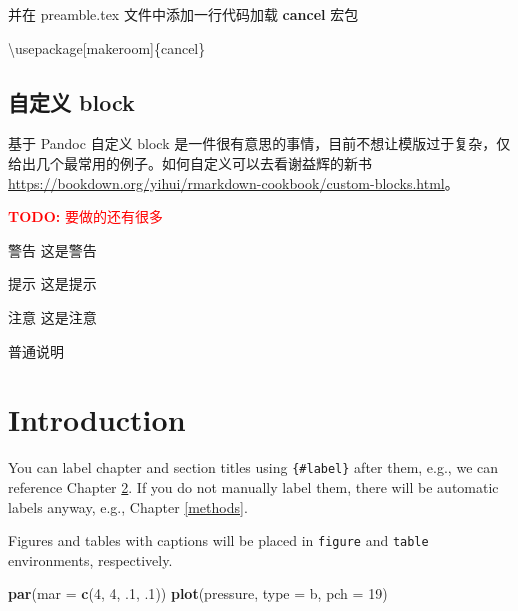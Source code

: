 \documentclass[
  lang=cn,
  11pt,
  scheme=chinese,
  chinesefont=nofont,
  citestyle=gb7714-2015,
  bibstyle=gb7714-2015]{elegantbook}
\newenvironment{Shaded}{\begin{snugshade}}{\end{snugshade}}
\newcommand{\BuiltInTok}[1]{#1}
\newcommand{\DataTypeTok}[1]{\textcolor[rgb]{0.13,0.29,0.53}{#1}}
\newcommand{\DecValTok}[1]{\textcolor[rgb]{0.00,0.00,0.81}{#1}}
\newcommand{\ExtensionTok}[1]{#1}
\newcommand{\FloatTok}[1]{\textcolor[rgb]{0.00,0.00,0.81}{#1}}
\newcommand{\KeywordTok}[1]{\textcolor[rgb]{0.13,0.29,0.53}{\textbf{#1}}}
\newcommand{\NormalTok}[1]{#1}
\newcommand{\StringTok}[1]{\textcolor[rgb]{0.31,0.60,0.02}{#1}}
\begin{document}
并在 preamble.tex 文件中添加一行代码加载 \textbf{cancel} 宏包

\begin{Shaded}
\begin{Highlighting}[]
\BuiltInTok{\textbackslash{}usepackage}\NormalTok{[makeroom]\{}\ExtensionTok{cancel}\NormalTok{\}}
\end{Highlighting}
\end{Shaded}

\hypertarget{custom-block}{%
\section{自定义 block}\label{custom-block}}

基于 Pandoc 自定义 block 是一件很有意思的事情，目前不想让模版过于复杂，仅给出几个最常用的例子。如何自定义可以去看谢益辉的新书 \url{https://bookdown.org/yihui/rmarkdown-cookbook/custom-blocks.html}。

\textcolor{red}{\textbf{TODO: }{要做的还有很多}}

\begin{rmdwarn}{警告}
这是警告

\end{rmdwarn}

\begin{rmdtip}{提示}
这是提示

\end{rmdtip}

\begin{rmdnote}{注意}
这是注意

\end{rmdnote}

普通说明

\hypertarget{intro}{%
\chapter{Introduction}\label{intro}}

You can label chapter and section titles using \texttt{\{\#label\}} after them, e.g., we can reference Chapter \ref{intro}. If you do not manually label them, there will be automatic labels anyway, e.g., Chapter \ref{methods}.

Figures and tables with captions will be placed in \texttt{figure} and \texttt{table} environments, respectively.

\begin{Shaded}
\begin{Highlighting}[]
\KeywordTok{par}\NormalTok{(}\DataTypeTok{mar =} \KeywordTok{c}\NormalTok{(}\DecValTok{4}\NormalTok{, }\DecValTok{4}\NormalTok{, }\FloatTok{.1}\NormalTok{, }\FloatTok{.1}\NormalTok{))}
\KeywordTok{plot}\NormalTok{(pressure, }\DataTypeTok{type =} \StringTok{\textquotesingle{}b\textquotesingle{}}\NormalTok{, }\DataTypeTok{pch =} \DecValTok{19}\NormalTok{)}
\end{Highlighting}
\end{Shaded}
\end{document}

